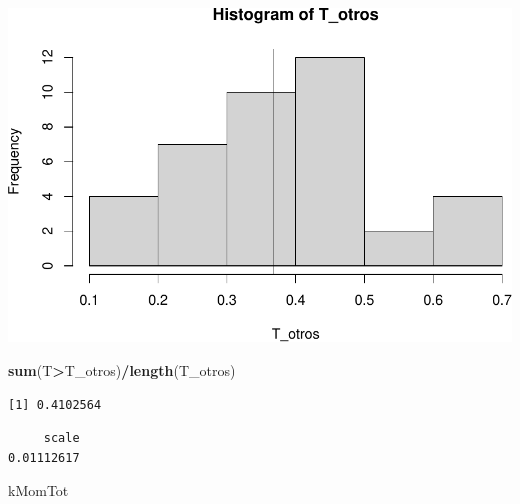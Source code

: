 \documentclass[
  12pt]{article}
\newenvironment{Shaded}{\begin{snugshade}}{\end{snugshade}}
\newcommand{\CommentTok}[1]{\textcolor[rgb]{0.56,0.35,0.01}{\textit{#1}}}
\newcommand{\DecValTok}[1]{\textcolor[rgb]{0.00,0.00,0.81}{#1}}
\newcommand{\FunctionTok}[1]{\textcolor[rgb]{0.13,0.29,0.53}{\textbf{#1}}}
\newcommand{\NormalTok}[1]{#1}
\newcommand{\OtherTok}[1]{\textcolor[rgb]{0.56,0.35,0.01}{#1}}
\newcommand{\SpecialCharTok}[1]{\textcolor[rgb]{0.81,0.36,0.00}{\textbf{#1}}}
\newcommand{\StringTok}[1]{\textcolor[rgb]{0.31,0.60,0.02}{#1}}
\begin{document}
\includegraphics{Entrega_files/figure-latex/unnamed-chunk-44-1.pdf}

\begin{Shaded}
\begin{Highlighting}[]
\FunctionTok{sum}\NormalTok{(T}\SpecialCharTok{\textgreater{}}\NormalTok{T\_otros)}\SpecialCharTok{/}\FunctionTok{length}\NormalTok{(T\_otros)}
\end{Highlighting}
\end{Shaded}

\begin{verbatim}
[1] 0.4102564
\end{verbatim}

\begin{Shaded}
\end{Shaded}

\begin{verbatim}
     scale 
0.01112617 
\end{verbatim}

\begin{Shaded}
\begin{Highlighting}[]
\NormalTok{kMomTot}
\end{Highlighting}
\end{Shaded}
\end{document}
